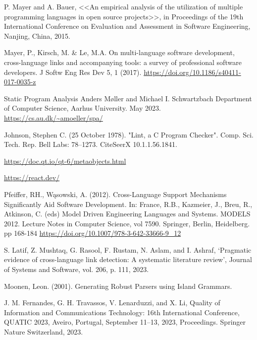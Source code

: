 \begingroup
\renewcommand{\section}[2]{\anonsection{Библиографический список}}
\begin{thebibliography}{00}

    P. Mayer and A. Bauer, 
    <<An empirical analysis of the utilization of multiple programming languages in open source projects>>, 
    in Proceedings of the 19th International Conference on Evaluation and Assessment in Software Engineering, 
    Nanjing, China, 2015.

    Mayer, P., Kirsch, M. \& Le, M.A. On multi-language software development,
    cross-language links and accompanying tools: 
    a survey of professional software developers. 
    J Softw Eng Res Dev 5, 1 (2017). \url{https://doi.org/10.1186/s40411-017-0035-z}


    Static Program Analysis
    Anders Møller and Michael I. Schwartzbach
    Department of Computer Science, Aarhus University. May 2023.
    \url{https://cs.au.dk/~amoeller/spa/}

    Johnson, Stephen C. (25 October 1978).
    "Lint, a C Program Checker". 
    Comp. Sci. Tech. Rep. Bell Labs: 78–1273.
    CiteSeerX 10.1.1.56.1841. 

    \url{https://doc.qt.io/qt-6/metaobjects.html}

    \url{https://react.dev/}

    Pfeiffer, RH., Wąsowski, A. (2012).
    Cross-Language Support Mechanisms Significantly Aid Software Development.
    In: France, R.B., Kazmeier, J., Breu, R., Atkinson, C. (eds)
    Model Driven Engineering Languages and Systems. MODELS 2012. 
    Lecture Notes in Computer Science, vol 7590. Springer, Berlin, Heidelberg.
    pp 168-184
    \url{https://doi.org/10.1007/978-3-642-33666-9_12}
    
    S. Latif, Z. Mushtaq, G. Rasool, F. Rustam, N. Aslam,
    and I. Ashraf, ‘Pragmatic evidence of cross-language link detection:
    A systematic literature review’, Journal of Systems and Software,
    vol. 206, p. 111, 2023.

    Moonen, Leon. (2001). Generating Robust Parsers using Island Grammars. 
    
    J. M. Fernandes, G. H. Travassos, V. Lenarduzzi, and X. Li, 
    Quality of Information and Communications Technology: 
    16th International Conference, QUATIC 2023,
    Aveiro, Portugal, September 11--13, 2023,
    Proceedings. Springer Nature Switzerland, 2023.

\end{thebibliography}
\endgroup

\clearpage
